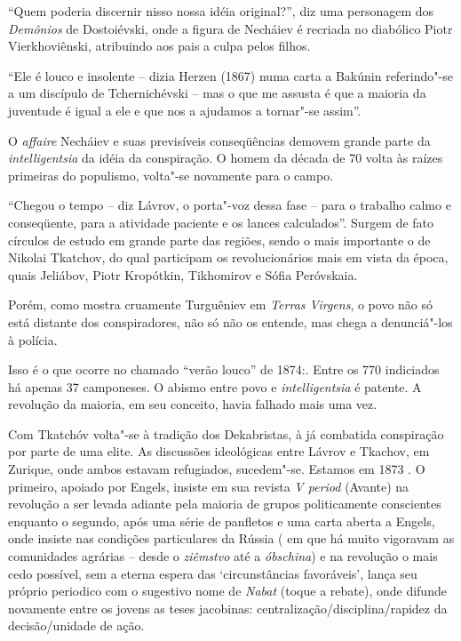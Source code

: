 ``Quem poderia discernir nisso nossa idéia original?'', diz uma
personagem dos \emph{Demônios} de Dostoiévski, onde a figura de Necháiev
é recriada no diabólico Piotr Vierkhoviênski, atribuindo aos pais a
culpa pelos filhos.

``Ele é louco e insolente -- dizia Herzen (1867) numa carta a Bakúnin
referindo"-se a um discípulo de Tchernichévski -- mas o que me assusta é
que a maioria da juventude é igual a ele e que nos a ajudamos a
tornar"-se assim''.

O \emph{affaire} Necháiev e suas previsíveis conseqüências demovem
grande parte da \emph{intelligentsia} da idéia da conspiração. O homem
da década de 70 volta às raízes primeiras do populismo, volta"-se
novamente para o campo.

``Chegou o tempo -- diz Lávrov, o porta"-voz dessa fase -- para o
trabalho calmo e conseqüente, para a atividade paciente e os lances
calculados''. Surgem de fato círculos de estudo em grande parte das
regiões, sendo o mais importante o de Nikolai Tkatchov, do qual
participam os revolucionários mais em vista da época, quais Jeliábov,
Piotr Kropótkin, Tikhomirov e Sófia Peróvskaia.

Porém, como mostra cruamente Turguêniev em \emph{Terras Virgens}, o povo
não só está distante dos conspiradores, não só não os entende, mas chega
a denunciá"-los à polícia.

Isso é o que ocorre no chamado ``verão louco'' de 1874:. Entre os 770
indiciados há apenas 37 camponeses. O abismo entre povo e
\emph{intelligentsia} é patente. A revolução da maioria, em seu
conceito, havia falhado mais uma vez.

Com Tkatchóv volta"-se à tradição dos Dekabristas, à já combatida
conspiração por parte de uma elite. As discussões ideológicas entre
Lávrov e Tkachov, em Zurique, onde ambos estavam refugiados, sucedem"-se.
Estamos em 1873 . O primeiro, apoiado por Engels, insiste em sua revista
\emph{V period} (Avante) na revolução a ser levada adiante pela maioria
de grupos politicamente conscientes enquanto o segundo, após uma série
de panfletos e uma carta aberta a Engels, onde insiste nas condições
particulares da Rússia ( em que há muito vigoravam as comunidades
agrárias -- desde o \emph{ziêmstvo} até a \emph{óbschina}) e na
revolução o mais cedo possível, sem a eterna espera das `circunstâncias
favoráveis', lança seu próprio periodico com o sugestivo nome de
\emph{Nabat} (toque a rebate), onde difunde novamente entre os jovens as
teses jacobinas: centralização/disciplina/rapidez da decisão/unidade de
ação.

